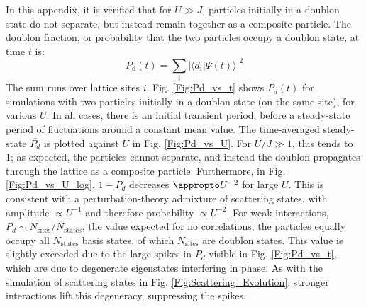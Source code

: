 In this appendix, it is verified that for $U\gg J$, particles initially in a doublon state do not separate, but instead remain together as a composite particle. The doublon fraction, or probability that the two particles occupy a doublon state, at time $t$ is:
\begin{equation}
    P_{\text{d}}(t)=\sum_{i}|\langle d_i|\Psi(t)\rangle|^2
\end{equation}
The sum runs over lattice sites $i$. Fig. \ref{Fig:Pd_vs_t} shows $P_d(t)$ for simulations with two particles initially in a doublon state (on the same site), for various $U$. In all cases, there is an initial transient period, before a steady-state period of fluctuations around a constant mean value. The time-averaged steady-state $\overline{P_d}$ is plotted against $U$ in Fig. \ref{Fig:Pd_vs_U}. For $U/J\gg1$, this tends to 1; as expected, the particles cannot separate, and instead the doublon propagates through the lattice as a composite particle. Furthermore, in Fig. \ref{Fig:Pd_vs_U_log}, $1-\overline{P_d}$ decreases $\appropto U^{-2}$ for large $U$. This is consistent with a perturbation-theory admixture of scattering states, with amplitude $\propto U^{-1}$ and therefore probability $\propto U^{-2}$. For weak interactions, $\overline{P_d}\sim N_{\text{sites}}/N_{\text{states}}$, the value expected for no correlations; the particles equally occupy all $N_{\text{states}}$ basis states, of which $N_{\text{sites}}$ are doublon states. This value is slightly exceeded due to the large spikes in $P_d$ visible in Fig. \ref{Fig:Pd_vs_t}, which are due to degenerate eigenstates interfering in phase. As with the simulation of scattering states in Fig. \ref{Fig:Scattering_Evolution}, stronger interactions lift this degeneracy, suppressing the spikes.

\vspace{1cm}

